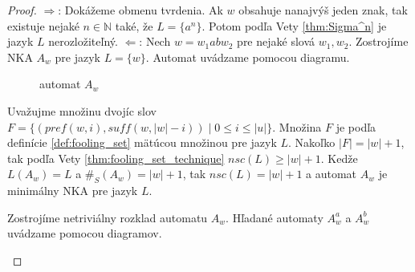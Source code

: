 \begin{proof}
$ \Rightarrow $: Dokážeme obmenu tvrdenia. Ak $ w $ obsahuje nanajvýš jeden znak, tak existuje nejaké $ n \in \mathbb{N} $ také, že $ L = \lbrace a^n \rbrace $. Potom podľa Vety \ref{thm:Sigma^n} je jazyk $ L $ nerozložiteľný.
$ \Leftarrow $: Nech $ w = w_1abw_2 $ pre nejaké slová $ w_1,w_2 $. Zostrojíme NKA $ A_w $ pre jazyk $ L = \lbrace w \rbrace $. Automat uvádzame pomocou diagramu.

\begin{figure}[H]
\centering
{}
\caption{automat $ A_w $}
\end{figure}

Uvažujme množinu dvojíc slov $ F = \lbrace (pref(w,i),suff(w,|w|-i)) \; | \; 0 \leq i \leq |u| \rbrace $. Množina $ F $ je podľa definície \ref{def:fooling_set} mätúcou množinou pre jazyk $ L $. Nakoľko $ |F| = |w|+1 $, tak podľa Vety \ref{thm:fooling_set_technique} $ nsc(L) \geq |w|+1 $. Kedže $ L(A_w) = L $ a $ \#_S(A_w) = |w|+1 $, tak $ nsc(L) = |w|+1 $ a automat $ A_w $ je minimálny NKA pre jazyk $ L $.
\par
Zostrojíme netriviálny rozklad automatu $ A_w $. Hľadané automaty $ A^a_w $ a $ A^b_w $ uvádzame pomocou diagramov.

\begin{figure}[H]
\centering
{}


\end{figure}
\end{proof}
